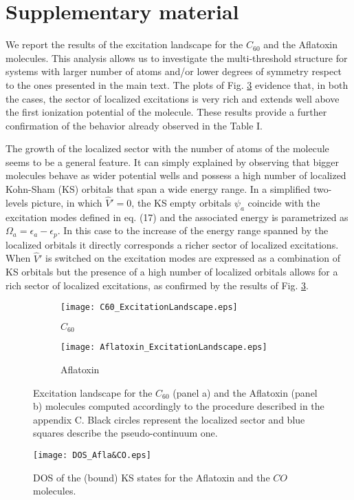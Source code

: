 \documentclass[11pt,a4paper]{article}
\newcommand{\op}[1]{\hat {#1}}
\begin{document}


\section*{Supplementary material}

We report the results of the excitation landscape for the $C_{60}$ and the Aflatoxin molecules. This analysis allows us to investigate the multi-threshold structure for systems with larger number of atoms and/or lower degrees of symmetry respect to the ones presented in the main text. The plots of Fig. \ref{exc-land} evidence that, in both the cases, the sector of localized excitations is very rich and extends well above the first ionization potential of the molecule. These results provide a further confirmation of the behavior already observed in the Table I. 

The growth of the localized sector with the number of atoms of the molecule seems to be a general feature. It can simply explained by observing that bigger molecules behave as wider potential wells and possess a high number of localized Kohn-Sham (KS) orbitals that span a wide energy range. In a simplified two-levels picture, in which $\op V'=0$, the KS empty orbitals $\psi_a$ coincide with the excitation modes defined in eq. (17) and the associated energy is parametrized as $\Omega_a=\epsilon_a-\epsilon_p$. In this case to the increase of the energy range spanned by the localized orbitals it directly corresponds a richer sector of localized excitations.
When $\op V'$ is switched on the excitation modes are expressed as a combination of KS orbitals but the presence of a high number of localized orbitals allows for a rich sector of localized excitations, as confirmed by the results of Fig. \ref{exc-land}.  

\begin{figure}[h]
    \centering
    \begin{subfigure}[t]{0.48\textwidth}
        \centering
        \texttt{[image: C60\_ExcitationLandscape.eps]} 
        \caption{$C_{60}$} \label{fig:b}
    \end{subfigure}
    \hfill
    \begin{subfigure}[t]{0.48\textwidth}
        \centering
        \texttt{[image: Aflatoxin\_ExcitationLandscape.eps]} 
        \caption{Aflatoxin} \label{fig:a}
    \end{subfigure}
    \caption{Excitation landscape for the $C_{60}$ (panel a) and the Aflatoxin (panel b) molecules computed accordingly to the procedure described  in the appendix C. Black circles represent the localized sector and blue squares describe the pseudo-continuum one. }
\label{exc-land}
\end{figure}

\begin{figure}[h]
    \centering
    \texttt{[image: DOS\_Afla\&CO.eps]} 
    \caption{DOS of the (bound) KS states for the Aflatoxin and the $CO$ molecules. }
\label{dos}
\end{figure}



\end{document}
